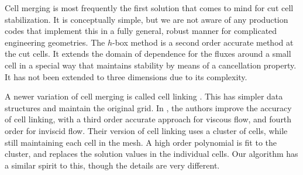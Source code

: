 Cell merging is most frequently the first solution that comes to mind for cut cell stabilization. It is conceptually simple, but 
we are not aware of any production codes that implement this in a fully
general, robust manner for complicated engineering geometries. 
The $h$-box method \cite{mjb-hel-rjl:hbox2,mjb-hel:hboxsimple}
is a second order accurate method at the cut cells. It extends the 
domain of dependence for the fluxes around a small cell in a 
special way that maintains stability by means of a cancellation
property. It  has not been extended to
three dimensions due to its complexity. 

A newer variation of cell merging is called cell linking \cite{cecereGiacomazzi,
KirkpatrickEtAl:2003, HuKhooAdamsHuang:2006,Chung:2006}.
This has simpler data structures and maintain the original grid. 
In \cite{BalajiMenon:2016}, the authors improve the accuracy of cell linking,
with a third order accurate approach for viscous flow,  and fourth order for 
inviscid flow. 
Their version of cell linking uses a cluster of cells, while still maintaining each cell in the mesh.  A high order polynomial is fit to the cluster, and replaces the solution values in the individual cells.  Our algorithm has a similar spirit to this, though the details are very different. 


